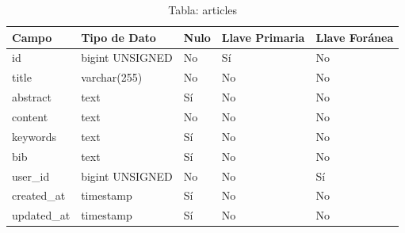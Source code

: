 \begin{table}[H]
    \centering
    \begin{tabular}{|p{5cm}|p{3cm}|p{1cm}|p{2cm}|p{2cm}|}
        \hline
        \textbf{Campo} & \textbf{Tipo de Dato} & \textbf{Nulo} & \textbf{Llave Primaria} & \textbf{Llave Foránea} \\
        \hline
        id & bigint UNSIGNED & No & Sí & No \\
        title & varchar(255) & No & No & No \\
        abstract & text & Sí & No & No \\
        content & text & No & No & No \\
        keywords & text & Sí & No & No \\
        bib & text & Sí & No & No \\
        user\_id & bigint UNSIGNED & No & No & Sí \\
        created\_at & timestamp & Sí & No & No \\
        updated\_at & timestamp & Sí & No & No \\
        \hline
    \end{tabular}
    \caption{Tabla: articles}
    \label{tab:articles}

\end{table}

